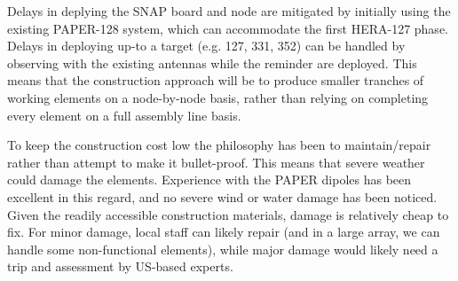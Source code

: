 \documentclass[preprint]{aastex}
\begin{document}
Delays in deplying the SNAP board and node are
mitigated by initially using the existing PAPER-128 system, which can accommodate the first 
HERA-127 phase.  Delays in deploying up-to a target (e.g. 127, 331, 352) can be handled by
observing with the existing antennas while the reminder are deployed.  This means that the
construction approach will be to produce smaller tranches of working elements on a node-by-node
basis, rather than relying on completing every element on a full assembly line basis.

To keep the construction cost low the philosophy has been to maintain/repair rather
than attempt to make it bullet-proof. This means that severe weather could damage the
elements. Experience with the PAPER dipoles has been excellent in this regard, and no
severe wind or water damage has been noticed. Given the readily accessible
construction materials, damage is relatively cheap to fix. For minor damage, local
staff can likely repair (and in a large array, we can handle some non-functional
elements), while major damage would likely need a trip and assessment by US-based
experts.
\end{document}
